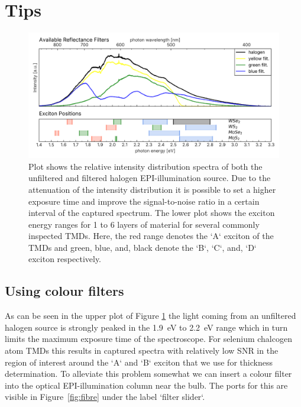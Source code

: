 \documentclass[a4paper]{scrartcl}
\begin{document}
\newpage
\section*{Tips}

\begin{figure}[h]
	\begin{center}
		\includegraphics[width=\linewidth]{figures/light_reference.png}
	\end{center}
	\caption{Plot shows the relative intensity distribution spectra of both the unfiltered and filtered halogen EPI-illumination source. Due to the attenuation of the intensity distribution it is possible to set a higher exposure time and improve the signal-to-noise ratio in a certain interval of the captured spectrum. The lower plot shows the exciton energy ranges for 1 to 6 layers of material for several commonly inspected TMDs. Here, the red range denotes the `A` exciton of the TMDs and green, blue, and, black denote the `B`, `C`, and, `D` exciton respectively.}
	\label{fig:refl_filt}
\end{figure}

\subsection*{Using colour filters}
As can be seen in the upper plot of Figure \ref{fig:refl_filt} the light coming from an unfiltered halogen source is strongly peaked in the \SI{1.9}{\electronvolt} to \SI{2.2}{\electronvolt} range which in turn limits the maximum exposure time of the spectroscope. For selenium chalcogen atom TMDs this results in captured spectra with relatively low SNR in the region of interest around the `A` and `B` exciton that we use for thickness determination.
To alleviate this problem somewhat we can insert a colour filter into the optical EPI-illumination column near the bulb. The ports for this are visible in Figure~\ref{fig:fibre} under the label `filter slider`.
\end{document}
